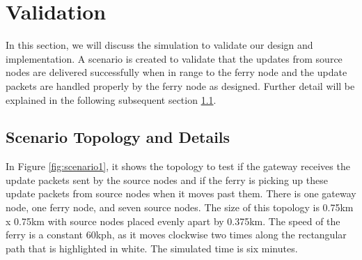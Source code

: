 %

\section{Validation} %

In this section, we will discuss the simulation to validate our design and implementation. 
A scenario is created to validate that the updates from source nodes are delivered successfully when in range to the ferry node and the update packets are handled properly by the ferry node as designed.   
Further detail will be explained in the following subsequent section \ref{sec:scenario1}.



\subsection{Scenario Topology  and Details}
\label{sec:scenario1}


In Figure \ref{fig:scenario1}, it shows the topology to test if the gateway receives the update packets sent by the source nodes and if the ferry is picking up these update packets from source nodes when it moves past them.
There is one gateway node, one ferry node, and seven source nodes. 
The size of this topology is 0.75km x 0.75km with source nodes placed evenly apart by 0.375km.  
The speed of the ferry is a constant 60kph, as it moves clockwise two times along the rectangular path that is highlighted in white.  The simulated time is six minutes.

